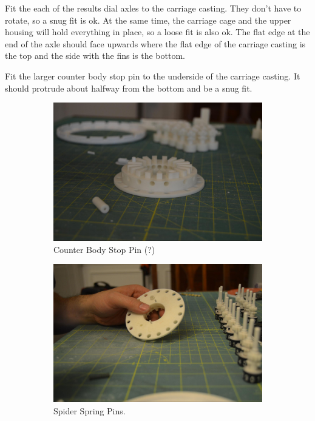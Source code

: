 \documentclass[openany]{book}
\begin{document}
Fit the each of the results dial axles to the carriage casting. They don’t have to rotate, so a snug fit is ok. At the same time, the carriage cage and the upper housing will hold everything in place, so a loose fit is also ok. The flat edge at the end of the axle should face upwards where the flat edge of the carriage casting is the top and the side with the fins is the bottom.


Fit the larger counter body stop pin to the underside of the carriage casting. It should protrude about halfway from the bottom and be a snug fit.

\begin{figure}[!ht]
	\centering
	\begin{subfigure}{.4\textwidth}
		\centering
		\includegraphics[width=.95\textwidth]{images/image53.jpg}
		\caption{Counter Body Stop Pin (?)}
		\label{fig:image53}	
	\end{subfigure}
	\begin{subfigure}{.4\textwidth}
		\centering
		\includegraphics[width=.95\textwidth]{images/image17.jpg}
		\caption{Spider Spring Pins.}
		\label{fig:image17}	
	\end{subfigure}
	\caption{}
\end{figure}
\end{document}
